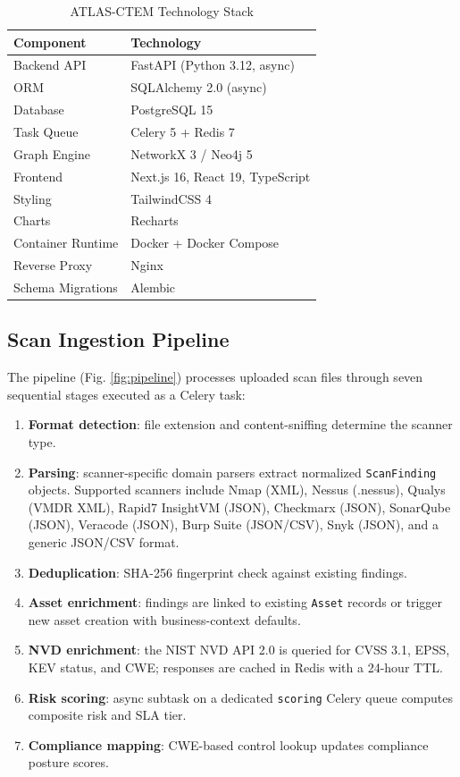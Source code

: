 \documentclass[conference]{IEEEtran}
\begin{document}
\begin{table}[h]
  \caption{ATLAS-CTEM Technology Stack}
  \label{tab:stack}
  \centering
  \begin{tabular}{@{}ll@{}}
    \toprule
    \textbf{Component} & \textbf{Technology} \\
    \midrule
    Backend API          & FastAPI (Python 3.12, async) \\
    ORM                  & SQLAlchemy 2.0 (async) \\
    Database             & PostgreSQL 15 \\
    Task Queue           & Celery 5 + Redis 7 \\
    Graph Engine         & NetworkX 3 / Neo4j 5 \\
    Frontend             & Next.js 16, React 19, TypeScript \\
    Styling              & TailwindCSS 4 \\
    Charts               & Recharts \\
    Container Runtime    & Docker + Docker Compose \\
    Reverse Proxy        & Nginx \\
    Schema Migrations    & Alembic \\
    \bottomrule
  \end{tabular}
\end{table}

\subsection{Scan Ingestion Pipeline}

The pipeline (Fig. \ref{fig:pipeline}) processes uploaded scan files through seven sequential stages executed as a Celery task:

\begin{enumerate}
  \item \textbf{Format detection}: file extension and content-sniffing determine the scanner type.
  \item \textbf{Parsing}: scanner-specific domain parsers extract normalized \texttt{ScanFinding} objects. Supported scanners include Nmap (XML), Nessus (.nessus), Qualys (VMDR XML), Rapid7 InsightVM (JSON), Checkmarx (JSON), SonarQube (JSON), Veracode (JSON), Burp Suite (JSON/CSV), Snyk (JSON), and a generic JSON/CSV format.
  \item \textbf{Deduplication}: SHA-256 fingerprint check against existing findings.
  \item \textbf{Asset enrichment}: findings are linked to existing \texttt{Asset} records or trigger new asset creation with business-context defaults.
  \item \textbf{NVD enrichment}: the NIST NVD API 2.0 is queried for CVSS 3.1, EPSS, KEV status, and CWE; responses are cached in Redis with a 24-hour TTL.
  \item \textbf{Risk scoring}: async subtask on a dedicated \texttt{scoring} Celery queue computes composite risk and SLA tier.
  \item \textbf{Compliance mapping}: CWE-based control lookup updates compliance posture scores.
\end{enumerate}
\end{document}
